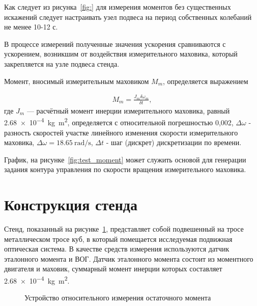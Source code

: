Как следует из рисунка~\cref{fig:} для измерения моментов без существенных искажений следует настраивать узел подвеса на период собственных колебаний не менее 10-12 с.

В процессе измерений полученные значения ускорения сравниваются с ускорением, возникшим от воздействия измерительного маховика, который закрепляется на узле подвеса стенда.

Момент, вносимый измерительным маховиком $M_m$, определяется выражением

\begin{samepage}
	\begin{equation}
		\label{eq:final_moment}
		\begin{alignedat}{2}
			M_m=\frac{J_m\delta\omega_m}{\delta t},
		\end{alignedat}
	\end{equation}
где $J_m$ — расчётный момент инерции измерительного маховика, равный 
\SI{2.68e-4}{\kilogram\metre\squared}, определяется с относительной погрешностью 0,002, $\Delta \omega$ - разность скоростей участке линейного изменения скорости измерительного маховика,  $\Delta \omega=\SI{18,65}{\radian\per\second}$, $\Delta t$ -  шаг (дискрет) дискретизации по времени.
\end{samepage}



График, на рисунке~\cref{fig:test_moment} может служить основой для генерации задания контура управления по скорости вращения измерительного маховика.



\section{Конструкция стенда}\label{sec:ch4/sect2}

Стенд, показанный на рисунке~\cref{fig:yoim}, представляет собой подвешенный на тросе металлическом тросе куб, в который помещается исследуемая подвижная оптическая система. В качестве средств измерения используются датчик эталонного момента и ВОГ. Датчик эталонного момента состоит из моментного двигателя и маховик, суммарный момент инерции которых составляет \SI{2.68e-4}{\kilogram\metre\squared}.

\begin{figure}[ht]
	\caption{Устройство относительного измерения остаточного момента}
	\label{fig:yoim}
\end{figure}

